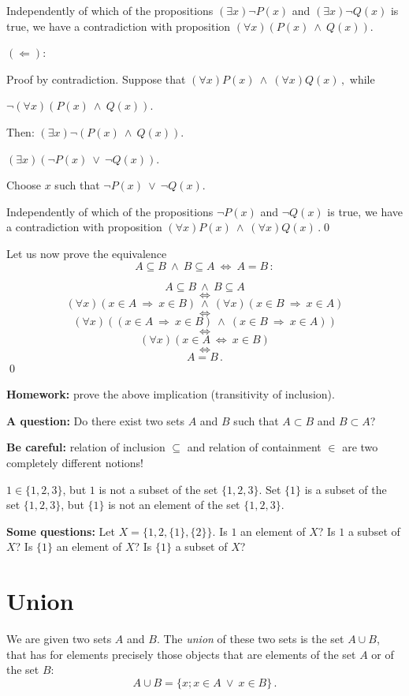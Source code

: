 \documentclass[11pt,paper=b5,footinclude,headinclude]{scrbook} %
\def\ali {{~\vee~}}
\def\inn {{~\wedge~}}
\def\sledi {{~\Rightarrow~}}
\def\cee {{~\Leftrightarrow~}}
\theoremstyle{remark}
\theoremstyle{definition} %
\theoremstyle{theorem} %
\begin{document}
Independently of which of the propositions $(\exists  x)\neg P(x)$
and $(\exists  x)\neg Q(x)$ is true, we have a contradiction with proposition
$(\forall x)(P(x)\inn Q(x))$.

$(\Leftarrow)$:

Proof by contradiction.
Suppose that $(\forall x)P(x)\inn (\forall x)Q(x)\,,$ while

$\neg (\forall x)(P(x)\inn Q(x))$.

Then:
$(\exists  x)\neg (P(x)\inn Q(x))$.

$(\exists  x)(\neg P(x)\ali \neg Q(x))$.

Choose $x$ such that $\neg P(x)\ali \neg Q(x)$.

Independently of which of the propositions $\neg P(x)$ and $\neg Q(x)$
is true, we have a contradiction with proposition
$(\forall x)P(x)\inn (\forall x)Q(x)\,.$\qed

\bigskip
Let us now prove the equivalence
$$A\subseteq B \inn B\subseteq A \cee A = B\,:$$

$$A\subseteq B \inn B\subseteq A$$
$$\cee$$
$$(\forall x)(x\in A\sledi x\in B) \inn (\forall x)(x\in B\sledi x\in A)$$
$$\cee$$
$$(\forall x)((x\in A\sledi x\in B) \inn (x\in B\sledi x\in A))$$
$$\cee$$
$$(\forall x)(x\in A\cee x\in B)$$
$$\cee$$
$$A = B\,.$$\qed


\textbf{ Homework:} prove the above implication (transitivity of inclusion).

\medskip
\textbf{ A question:} Do there exist two sets $A$ and $B$ such that $A\subset B$ and $B\subset A$?

\bigskip
\textbf{ Be careful:} relation of inclusion $\subseteq$ and relation of containment $\in$ are two completely different
notions!

$1\in\{1,2,3\}$, but $1$ is not a subset of the set $\{1,2,3\}$.
Set $\{1\}$ is a subset of the set $\{1,2,3\}$, but
$\{1\}$ is not an element of the set $\{1,2,3\}$.

\medskip

\textbf{ Some questions:} Let $X = \{1,2,\{1\},\{2\}\}$.
Is $1$ an element of $X$?
Is $1$ a subset of $X$?
Is $\{1\}$ an element of $X$?
Is $\{1\}$ a subset of $X$?

\bigskip

\section{Union}
We are given two sets $A$ and $B$. The {\em union} of these two sets is the set $A\cup B$,
that has for elements precisely those objects that are elements of the set $A$ or of the set $B$:
$$A\cup B = \{x; x\in A \ali x\in B\}\,.$$
\end{document}

